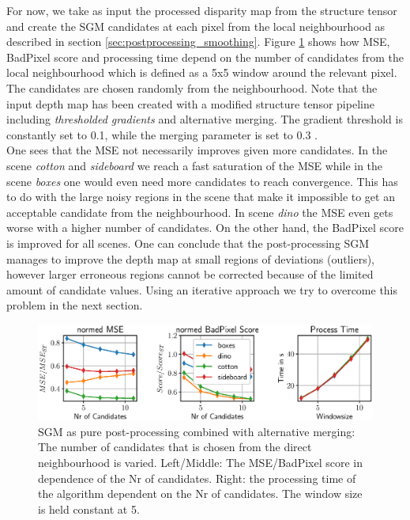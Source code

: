 \documentclass  [
  paper    = a4,
  BCOR     = 10mm,
  twoside,
  fontsize = 12pt,
  fleqn,
  toc      = bibnumbered,
  toc      = listofnumbered,
  numbers  = noendperiod,
  headings = normal,
  listof   = leveldown,
  version  = 3.03
]                                       {scrreprt}
\begin{document}
For now, we take as input the processed disparity map from the structure tensor and create the SGM candidates at each pixel from the local neighbourhood as described in section \ref{sec:postprocessing_smoothing}. Figure \ref{fig:chooselowersgmpprwindowsize5} shows how MSE, BadPixel score and processing time depend on the number of candidates from the local neighbourhood which is defined as a 5x5 window around the relevant pixel. The candidates are chosen randomly from the neighbourhood. Note that the input depth map has been created with a modified structure tensor pipeline including \textit{thresholded gradients} and alternative merging. The gradient threshold is constantly set to 0.1, while the merging parameter is set to 0.3 .\\
 One sees that the MSE not necessarily improves given more candidates. In the scene \textit{cotton} and \textit{sideboard} we reach a fast saturation of the MSE while in the scene \textit{boxes} one would even need more candidates to reach convergence. This has to do with the large noisy regions in the scene that make it impossible to get an acceptable candidate from the neighbourhood. In scene \textit{dino} the MSE even gets worse with a higher number of candidates. On the other hand, the BadPixel score is improved for all scenes. One can conclude that the post-processing SGM manages to improve the depth map at small regions of deviations (outliers), however larger erroneous regions cannot be corrected because of the limited amount of candidate values. Using an iterative approach we try to overcome this problem in the next section.\\ 


\begin{figure}[h!]
	\centering
	\includegraphics[width=01\linewidth]{images/choose_lower_sgm_ppr_windowsize_5}
	\caption[SGM as pure post-processing combined with alternative merging parameter dependence]{SGM as pure post-processing combined with alternative merging: The number of candidates that is chosen from the direct neighbourhood is varied. Left/Middle: The MSE/BadPixel score in dependence of the Nr of candidates. Right: the processing time of the algorithm dependent on the Nr of candidates. The window size is held constant at 5.}
	\label{fig:chooselowersgmpprwindowsize5}
\end{figure}
\end{document}

